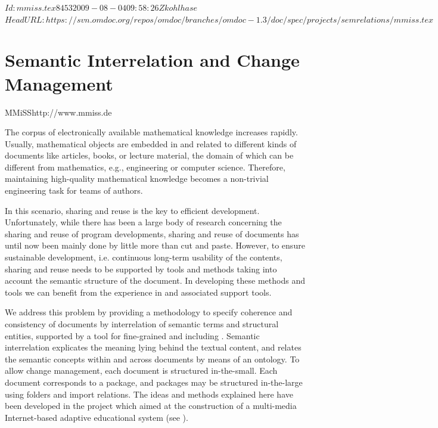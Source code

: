 \svnInfo $Id: mmiss.tex 8453 2009-08-04 09:58:26Z kohlhase $
\svnKeyword $HeadURL: https://svn.omdoc.org/repos/omdoc/branches/omdoc-1.3/doc/spec/projects/semrelations/mmiss.tex $

\section{Semantic Interrelation and Change Management}
\begin{project}{MMiSS}{http://www.mmiss.de}
\end{project}
The corpus of electronically available mathematical knowledge increases rapidly.  Usually,
mathematical objects are embedded in and related to different kinds of documents like
articles, books, or lecture material, the domain of which can be different from
mathematics, e.g., engineering or computer science. Therefore, maintaining high-quality
mathematical knowledge becomes a non-trivial engineering task for teams of authors.

In this scenario, sharing and reuse is the
key to efficient development. Unfortunately, while there has been a large body of research
concerning the sharing and reuse of program developments, sharing and reuse of documents
has until now been mainly done by little more than cut and paste.  However, to ensure
sustainable development, i.e. continuous long-term usability of the contents, sharing and
reuse needs to be supported by tools and methods taking into account the semantic
structure of the document. In developing these methods and tools we can benefit from the
experience in {} and associated support tools.

We address this problem by providing a methodology to specify coherence and consistency of
documents by interrelation of semantic terms and structural entities, supported by a tool
for fine-grained {} and {}
including {}. Semantic
interrelation explicates the meaning lying behind the
textual content, and relates the semantic concepts within and across documents by means of
an ontology. To allow change management, each document is structured in-the-small.  Each
document corresponds to a package, and packages may be structured in-the-large using
folders and import relations. The ideas and methods explained here have been developed in
the \MMISS{} project which aimed at the construction of a multi-media Internet-based
adaptive educational system (see \cite{MMISS-WADT03,SemInter-DELFI04,MMISS-TechReport04}).

